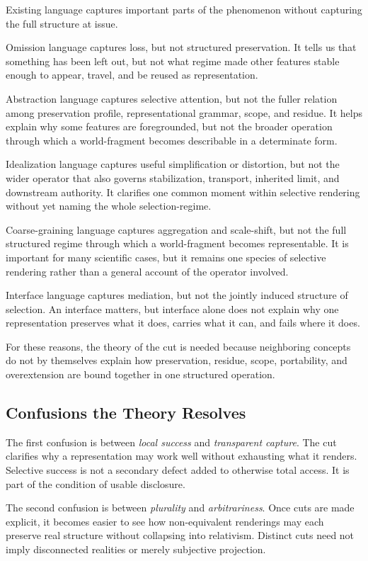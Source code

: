 \documentclass[11pt]{article}
\renewcommand{\emph}[1]{\textit{#1}}
\begin{document}
Existing language captures important parts of the phenomenon without capturing the full structure at issue.

Omission language captures loss, but not structured preservation. It tells us that something has been left out, but not what regime made other features stable enough to appear, travel, and be reused as representation.

Abstraction language captures selective attention, but not the fuller relation among preservation profile, representational grammar, scope, and residue. It helps explain why some features are foregrounded, but not the broader operation through which a world-fragment becomes describable in a determinate form.

Idealization language captures useful simplification or distortion, but not the wider operator that also governs stabilization, transport, inherited limit, and downstream authority. It clarifies one common moment within selective rendering without yet naming the whole selection-regime.

Coarse-graining language captures aggregation and scale-shift, but not the full structured regime through which a world-fragment becomes representable. It is important for many scientific cases, but it remains one species of selective rendering rather than a general account of the operator involved.

Interface language captures mediation, but not the jointly induced structure of selection. An interface matters, but interface alone does not explain why one representation preserves what it does, carries what it can, and fails where it does.

For these reasons, the theory of the cut is needed because neighboring concepts do not by themselves explain how preservation, residue, scope, portability, and overextension are bound together in one structured operation.

\subsection{Confusions the Theory Resolves}

The first confusion is between \emph{local success} and \emph{transparent capture}. The cut clarifies why a representation may work well without exhausting what it renders. Selective success is not a secondary defect added to otherwise total access. It is part of the condition of usable disclosure.

The second confusion is between \emph{plurality} and \emph{arbitrariness}. Once cuts are made explicit, it becomes easier to see how non-equivalent renderings may each preserve real structure without collapsing into relativism. Distinct cuts need not imply disconnected realities or merely subjective projection.
\end{document}

